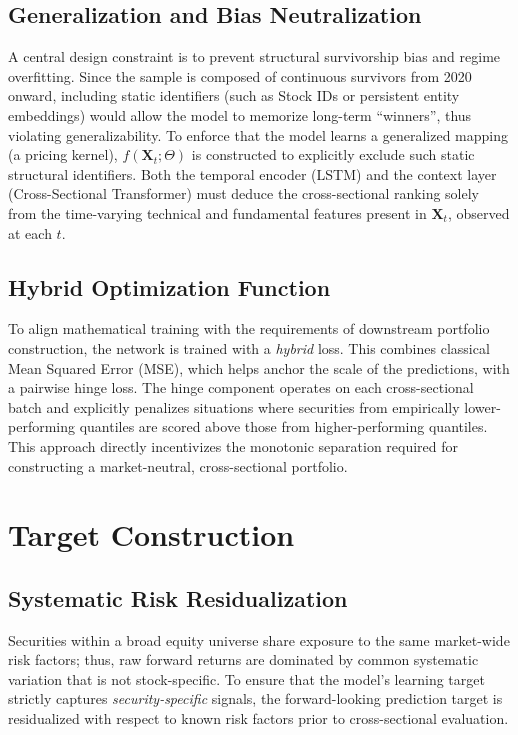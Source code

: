 \subsection*{Generalization and Bias Neutralization}
A central design constraint is to prevent structural survivorship bias and regime overfitting. Since the sample is composed of continuous survivors from 2020 onward, including static identifiers (such as Stock IDs or persistent entity embeddings) would allow the model to memorize long-term “winners”, thus violating generalizability. To enforce that the model learns a generalized mapping (a pricing kernel), $f(\mathbf{X}_t; \Theta)$ is constructed to explicitly exclude such static structural identifiers. Both the temporal encoder (\acs{LSTM}) and the context layer (Cross-Sectional Transformer) must deduce the cross-sectional ranking solely from the time-varying technical and fundamental features present in $\mathbf{X}_t$, observed at each $t$.

\subsection*{Hybrid Optimization Function}

To align mathematical training with the requirements of downstream portfolio construction, the network is trained with a \emph{hybrid} loss. This combines classical Mean Squared Error (MSE), which helps anchor the scale of the predictions, with a pairwise hinge loss. The hinge component operates on each cross-sectional batch and explicitly penalizes situations where securities from empirically lower-performing quantiles are scored above those from higher-performing quantiles. This approach directly incentivizes the monotonic separation required for constructing a market-neutral, cross-sectional portfolio.

\section{Target Construction}
\subsection*{Systematic Risk Residualization}

Securities within a broad equity universe share exposure to the same market-wide risk factors; thus, raw forward returns are dominated by common systematic variation that is not stock-specific. To ensure that the model's learning target strictly captures \emph{security-specific} signals, the forward-looking prediction target is residualized with respect to known risk factors prior to cross-sectional evaluation.

